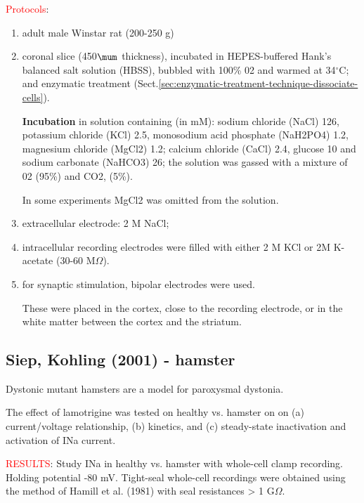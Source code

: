 \textcolor{red}{Protocols}:
\begin{enumerate}
  \item adult male Winstar rat (200-250 g)
  
  \item coronal slice (450$\mum$ thickness), incubated in 
  HEPES-buffered Hank's balanced salt solution (HBSS), bubbled with 100\% 02 and
  warmed at 34$^\circ$C; and enzymatic treatment
  (Sect.\ref{sec:enzymatic-treatment-technique-dissociate-cells}).
  
{\bf Incubation} in solution containing (in mM): sodium chloride (NaCl) 126,
potassium chloride (KCl) 2.5, monosodium acid phosphate (NaH2PO4) 1.2, magnesium
chloride (MgCl2) 1.2; calcium chloride (CaCl) 2.4, glucose 10 and sodium
carbonate (NaHCO3) 26; the solution was gassed with a mixture of 02 (95\%) and
CO2, (5\%).

In some experiments MgCl2 was omitted from the solution.
  
   \item extracellular electrode: 2 M NaCl; 
   
   \item intracellular recording electrodes were filled with either 2 M KCl or 
   2M K-acetate (30-60 M$\Omega$).
   
   \item for synaptic stimulation, bipolar electrodes were used.
   
 These were placed in the cortex, close to the recording electrode, or in the
 white matter between the cortex and the striatum.
  
\end{enumerate}

\subsection{Siep, Kohling (2001) - hamster}
\label{sec:Nat-striatal-Siep-Kohling-2001}
\label{sec:dystonic-mutant-hamster}
\label{sec:paroxysmal-dystonia-hamster-model}


Dystonic mutant \dtsz hamsters are a model for paroxysmal dystonia.

The effect of lamotrigine was tested on healthy vs. \dtsz hamster on 
on (a) current/voltage relationship, (b) kinetics, and (c) steady-state inactivation
and activation of INa current.


\textcolor{red}{RESULTS}: Study INa in healthy vs. \dtsz hamster with whole-cell
clamp recording. Holding potential -80 mV. Tight-seal whole-cell
recordings were obtained using the method of Hamill et al. (1981) with seal
resistances > 1 G$\Omega$.
 
